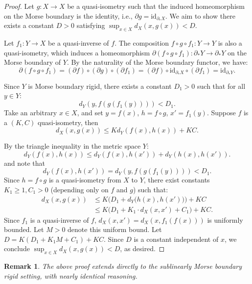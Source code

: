 \documentclass[a4paper,11pt,oneside]{article}
\newtheorem{Remark}[Theorem]{Remark}
\begin{document}
\begin{proof}

Let \( g: X \to X \) be a quasi-isometry such that the induced homeomorphism on the Morse boundary is the identity, i.e., \( \partial g = \text{id}_{\partial_* X} \). We aim to show there exists a constant \( D > 0 \) satisfying \( \sup_{x \in X} d_X(x, g(x)) < D \).

Let \( f_1: Y \to X \) be a quasi-inverse of \( f \). The composition \( f \circ g \circ f_1: Y \to Y \) is also a quasi-isometry, which induces a homeomorphism \( \partial(f \circ g \circ f_1): \partial_* Y \to \partial_* Y \) on the Morse boundary of \( Y \). By the naturality of the Morse boundary functor, we have:
\[
\partial(f \circ g \circ f_1) = (\partial f) \circ (\partial g) \circ (\partial f_1) = (\partial f) \circ \text{id}_{\partial_* X} \circ (\partial f_1) = \text{id}_{\partial_* Y}.
\]

Since \( Y \) is Morse boundary rigid, there exists a constant \( D_1 > 0 \) such that for all \( y \in Y \):
\[
d_Y\left(y, f\left(g\left(f_1(y)\right)\right)\right) < D_1.
\]
Take an arbitrary \( x \in X \), and set \( y = f(x) \), \( h = f \circ g \), \( x' = f_1(y) \). Suppose \( f \) is a $(K, C)$ quasi-isometry, then
\[
d_X(x, g(x)) \le K d_Y\left(f(x), h(x)\right) + KC.
\]

By the triangle inequality in the metric space \( Y \):
\[
d_Y\left(f(x), h(x)\right) \le d_Y\left(f(x), h(x')\right) + d_Y\left(h(x), h(x')\right).
\]
  and note that
\[
d_Y\left(f(x), h(x')\right) = d_Y\left(y, f\left(g\left(f_1(y)\right)\right)\right) < D_1.
\]
Since \( h = f \circ g \) is a quasi-isometry from \( X \) to \( Y \), there exist constants \( K_1\ge1, C_1 > 0 \) (depending only on \( f \) and \( g \)) such that:
\[
\begin{aligned}
d_X(x, g(x)) 
&\le K \bigl(D_1 + d_Y\bigl(h(x), h(x')\bigr)\bigr) + KC \\
&\le K \bigl(D_1 + K_1 \cdot d_X(x, x') + C_1\bigr) + KC.
\end{aligned}
\]
Since \( f_1 \) is a quasi-inverse of \( f \), \( d_X(x, x') = d_X\left(x, f_1(f(x))\right) \) is uniformly bounded. Let \( M > 0 \) denote this uniform bound.
Let \( D = K \left(D_1 + K_1 M + C_1\right) + KC \). Since \( D \) is a constant independent of \( x \), we conclude \( \sup_{x \in X} d_X(x, g(x)) < D \), as desired.

\end{proof}


\begin{Remark}
   The above proof extends directly to the sublinearly Morse boundary rigid setting, with nearly identical reasoning.
\end{Remark}
 
\end{document}
